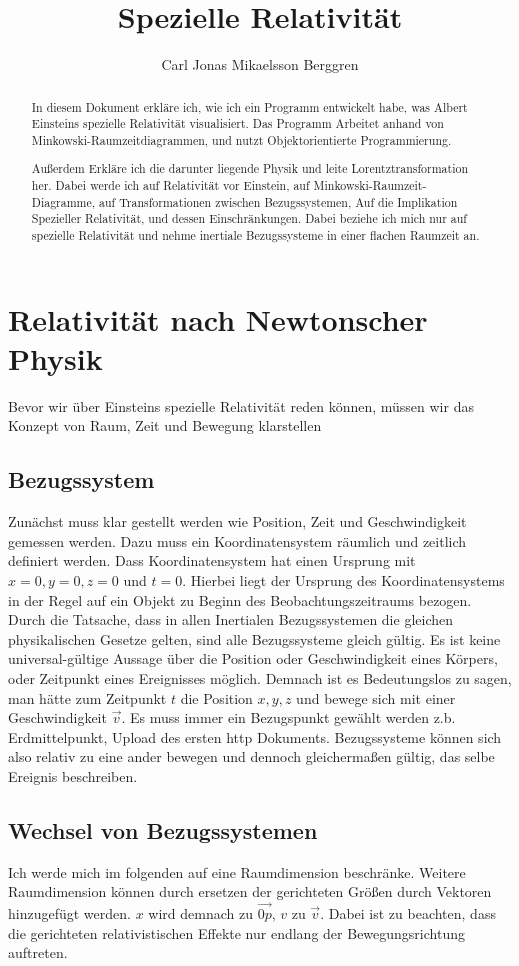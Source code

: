 \documentclass[12pt]{article}
\author{{\Huge Carl Jonas Mikaelsson Berggren}}
\title{{\myfont Spezielle Relativität}}
\begin{document}
\maketitle
\tableofcontents
\newpage
\begin{abstract}
In diesem Dokument erkläre ich, wie ich ein Programm entwickelt habe, was Albert Einsteins spezielle Relativität visualisiert.
Das Programm Arbeitet anhand von Minkowski-Raumzeitdiagrammen, und nutzt Objektorientierte Programmierung.

Außerdem Erkläre ich die darunter liegende Physik und leite Lorentztransformation her.
Dabei werde ich auf Relativität vor Einstein, auf Minkowski-Raumzeit-Diagramme, auf Transformationen zwischen Bezugssystemen, Auf die Implikation Spezieller Relativität, und dessen Einschränkungen.
Dabei beziehe ich mich nur auf spezielle Relativität und nehme inertiale Bezugssysteme in einer flachen Raumzeit an.
\end{abstract}
\section{Relativität nach Newtonscher Physik}
Bevor wir über Einsteins spezielle Relativität reden können, müssen wir das Konzept von Raum, Zeit und Bewegung klarstellen
\subsection{Bezugssystem}
Zunächst muss klar gestellt werden wie Position, Zeit und Geschwindigkeit gemessen werden.
Dazu muss ein Koordinatensystem räumlich und zeitlich definiert werden.
Dass Koordinatensystem hat einen Ursprung  mit $x = 0, y =0, z = 0$ und $t = 0$.
Hierbei liegt der Ursprung des Koordinatensystems in der Regel auf ein Objekt zu Beginn des Beobachtungszeitraums bezogen.
Durch die Tatsache, dass in allen Inertialen Bezugssystemen die gleichen physikalischen Gesetze gelten, sind alle Bezugssysteme gleich gültig.
Es ist keine universal-gültige Aussage über die Position oder Geschwindigkeit eines Körpers, oder Zeitpunkt eines Ereignisses möglich.
Demnach ist es Bedeutungslos zu sagen, man hätte zum Zeitpunkt $t$ die Position $x, y, z$ und bewege sich mit einer Geschwindigkeit $\vec{v}$.
Es muss immer ein Bezugspunkt gewählt werden z.b. Erdmittelpunkt, Upload des ersten http Dokuments.
Bezugssysteme können sich also relativ zu eine ander bewegen und dennoch gleichermaßen gültig, das selbe Ereignis beschreiben.
\subsection{Wechsel von Bezugssystemen}
Ich werde mich im folgenden auf eine Raumdimension beschränke.
Weitere Raumdimension können durch ersetzen der gerichteten Größen durch Vektoren hinzugefügt werden.
$x$ wird demnach zu $\vec{0p}$, $v$ zu $\vec{v}$.
Dabei ist zu beachten, dass die gerichteten relativistischen Effekte nur endlang der Bewegungsrichtung auftreten.
\end{document}

